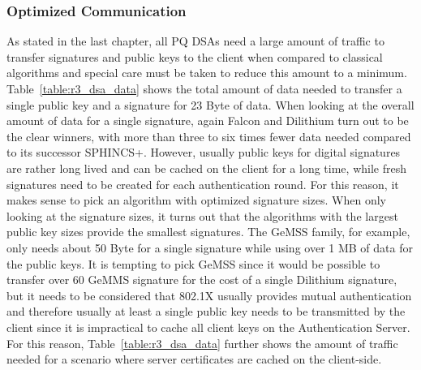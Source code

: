\subsubsection{Optimized Communication}

As stated in the last chapter, all \ac{PQ} \acp{DSA} need a large amount of traffic to transfer signatures and public keys to the client when compared to classical algorithms and special care must be taken to reduce this amount to a minimum. Table~\ref{table:r3_dsa_data} shows the total amount of data needed to transfer a single public key and a signature for 23 Byte of data. When looking at the overall amount of data for a single signature, again Falcon and Dilithium turn out to be the clear winners, with more than three to six times fewer data needed compared to its successor SPHINCS+. However, usually public keys for digital signatures are rather long lived and can be cached on the client for a long time, while fresh signatures need to be created for each authentication round. For this reason, it makes sense to pick an algorithm with optimized signature sizes. When only looking at the signature sizes, it turns out that the algorithms with the largest public key sizes provide the smallest signatures. The GeMSS family, for example, only needs about 50 Byte for a single signature while using over 1 MB of data for the public keys. It is tempting to pick GeMSS since it would be possible to transfer over 60 GeMMS signature for the cost of a single Dilithium signature, but it needs to be considered that 802.1X usually provides mutual authentication and therefore usually at least a single public key needs to be transmitted by the client since it is impractical to cache all client keys on the Authentication Server. For this reason, Table~\ref{table:r3_dsa_data} further shows the amount of traffic needed for a scenario where server certificates are cached on the client-side. 

